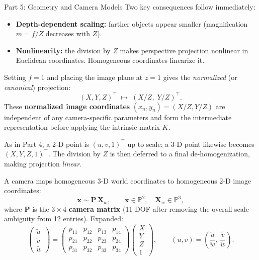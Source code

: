 \documentclass[letterpaper]{article}
\begin{document}
\begin{notes}{Part 5: Geometry and Camera Models}
Two key consequences follow immediately:
\begin{itemize}[noitemsep]
  \item \textbf{Depth-dependent scaling:} farther objects appear smaller
        (magnification $m = f/Z$ decreases with $Z$).
  \item \textbf{Nonlinearity:} the division by $Z$ makes perspective projection
        nonlinear in Euclidean coordinates.  Homogeneous coordinates linearize it.
\end{itemize}


Setting $f = 1$ and placing the image plane at $z = 1$ gives the
\emph{normalized} (or \emph{canonical}) projection:
\begin{equation}
  (X, Y, Z)^\top \;\longmapsto\; (X/Z,\; Y/Z)^\top.
  \label{eq:norm-proj}
\end{equation}
These \textbf{normalized image coordinates} $(x_n, y_n) = (X/Z, Y/Z)$ are
independent of any camera-specific parameters and form the intermediate
representation before applying the intrinsic matrix $K$.



As in Part 4, a 2-D point is $(u,v,1)^\top$ up to scale; a 3-D point
likewise becomes $(X,Y,Z,1)^\top$.  The division by $Z$ is then deferred
to a final de-homogenization, making projection \emph{linear}.


A camera maps homogeneous 3-D world coordinates to homogeneous 2-D image
coordinates:
\begin{equation}
  \mathbf{x} \sim \mathbf{P}\,\mathbf{X}_w,
  \qquad
  \mathbf{x} \in \mathbb{P}^2,\quad \mathbf{X}_w \in \mathbb{P}^3,
\end{equation}
where $\mathbf{P}$ is the $3\times 4$ \textbf{camera matrix} (11 DOF after
removing the overall scale ambiguity from 12 entries).  Expanded:
\[
\begin{pmatrix}
    \tilde{u} \\ \tilde{v} \\ \tilde{w}
\end{pmatrix}
=
\begin{pmatrix}
    p_{11} & p_{12} & p_{13} & p_{14} \\
    p_{21} & p_{22} & p_{23} & p_{24} \\
    p_{31} & p_{32} & p_{33} & p_{34}
\end{pmatrix}
\begin{pmatrix}
    X \\ Y \\ Z \\ 1
\end{pmatrix},
\qquad
(u,v) = \left(\frac{\tilde{u}}{\tilde{w}},\, \frac{\tilde{v}}{\tilde{w}}\right).
\]


\end{notes}
\end{document}
